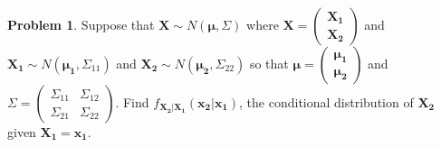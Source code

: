 \documentclass[12pt]{article}
\theoremstyle{definition}
\newtheorem{problem}{Problem}
\newcommand{\vect}[1]{\boldsymbol{#1}}
\begin{document}
\begin{problem}
  Suppose that $\vect{X} \sim N(\vect{\mu}, \Sigma)$ where
  $\vect{X} = \begin{pmatrix} \vect{X_1} \\ \vect{X_2} \end{pmatrix}$ and
  $\vect{X_1} \sim N(\vect{\mu_1}, \Sigma_{11})$ and $\vect{X_2} \sim N(\vect{\mu_2}, \Sigma_{22})$ so that
  $\vect{\vect{\mu}} = \begin{pmatrix} \vect{\mu_1} \\ \vect{\mu_2} \end{pmatrix}$ and
  $\Sigma = \begin{pmatrix} \Sigma_{11}& \Sigma_{12} \\ \Sigma_{21} & \Sigma_{22} \end{pmatrix}$.
  Find $f_{\vect{X_2}|\vect{X_1}}(\vect{x_2}|\vect{x_1})$, the
  conditional distribution of $\vect{X_2}$ given $\vect{X_1}=\vect{x_1}$.
\end{problem}
\end{document}
